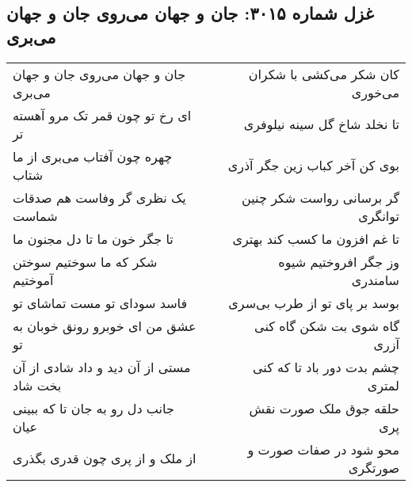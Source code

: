 \begin{center}
\section*{غزل شماره ۳۰۱۵: جان و جهان می‌روی جان و جهان می‌بری}
\label{sec:3015}
\begin{longtable}{l p{0.5cm} r}
جان و جهان می‌روی جان و جهان می‌بری
&&
کان شکر می‌کشی با شکران می‌خوری
\\
ای رخ تو چون قمر تک مرو آهسته تر
&&
تا نخلد شاخ گل سینه نیلوفری
\\
چهره چون آفتاب می‌بری از ما شتاب
&&
بوی کن آخر کباب زین جگر آذری
\\
یک نظری گر وفاست هم صدقات شماست
&&
گر برسانی رواست شکر چنین توانگری
\\
تا جگر خون ما تا دل مجنون ما
&&
تا غم افزون ما کسب کند بهتری
\\
شکر که ما سوختیم سوختن آموختیم
&&
وز جگر افروختیم شیوه سامندری
\\
فاسد سودای تو مست تماشای تو
&&
بوسد بر پای تو از طرب بی‌سری
\\
عشق من ای خوبرو رونق خوبان به تو
&&
گاه شوی بت شکن گاه کنی آزری
\\
مستی از آن دید و داد شادی از آن بخت شاد
&&
چشم بدت دور باد تا که کنی لمتری
\\
جانب دل رو به جان تا که ببینی عیان
&&
حلقه جوق ملک صورت نقش پری
\\
از ملک و از پری چون قدری بگذری
&&
محو شود در صفات صورت و صورتگری
\\
\end{longtable}
\end{center}
